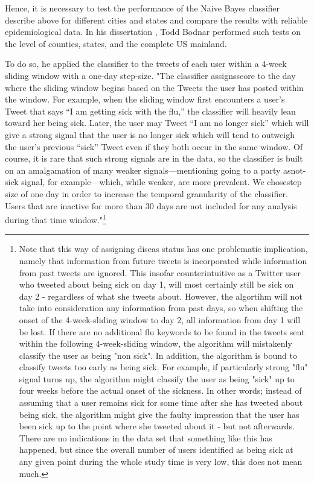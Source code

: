 \documentclass[11pt, a4paper]{report}\usepackage[]{graphicx}\usepackage[]{color}
\begin{document}
Hence, it is necessary to test the performance of the Naive Bayes classifier describe above for different cities and states and compare the results with reliable epidemiological data. In his dissertation \citep{bodnar_data_2015}, Todd Bodnar performed such tests on the level of counties, states, and the complete US mainland.\newline

To do so, he applied the classifier to the tweets of each user within a 4-week sliding window with a one-day step-size. "The classifier assignsscore to the day where the sliding window begins based on the Tweets the user has posted within the window. For example, when the sliding window first encounters a user’s Tweet that says “I am getting sick with the flu,” the classifier will heavily lean toward her being sick. Later, the user may Tweet “I am no longer sick” which will give a strong signal that the user is no longer sick which will tend to outweigh the user’s previous “sick” Tweet even if they both occur in the same window. Of course, it is rare that such strong signals are in the data, so the classifier is built on an amalgamation of many weaker signals—mentioning going to a party asnot-sick signal, for example—which, while weaker, are more prevalent. We chosestep size of one day in order to increase the temporal granularity of the classifier. Users that are inactive for more than 30 days are not included for any analysis during that time window."\footnote{Note that this way of assigning diseas status has one problematic implication, namely that information from future tweets is incorporated while information from past tweets are ignored. This insofar counterintuitive as a Twitter user who tweeted about being sick on day 1, will most certainly still be sick on day 2 - regardless of what she tweets about. However, the algortihm will not take into consideration any information from past days, so when shifting the onset of the 4-week-sliding window to day 2, all information from day 1 will be lost. If there are no additional flu keywords to be found in the tweets sent within the following 4-week-sliding window, the algorithm will mistakenly classify the user as being "non sick". 
In addition, the algorithm is bound to classify tweets too early as being sick. For example, if particularly strong "flu" signal turns up, the algorithm might classify the user as being "sick" up to four weeks before the actual onset of the sickness. In other words; instead of assuming that a user remains sick for some time after she has tweeted about being sick, the algorithm might give the faulty impression that the user has been sick up to the point where she tweeted about it - but not afterwards.
There are no indications in the data set that something like this has happened, but since the overall number of users identified as being sick at any given point during the whole study time is very low, this does not mean much.}\newline
\end{document}
